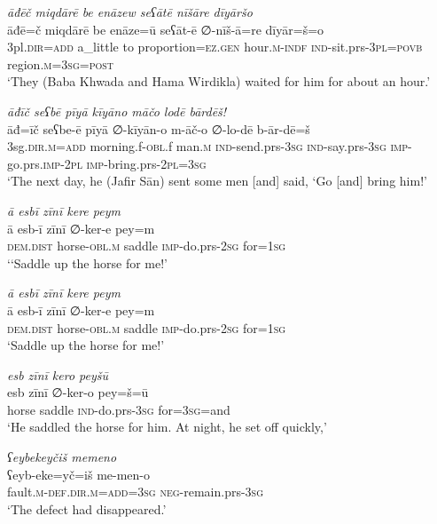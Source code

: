 \ea \label{BP.189}
\textit{āđēč miqdārē be enāzew seʕātē nīšāre dīyāršo} \\ 
\gll āđē=č miqdārē be enāze=ū seʕāt-ē ∅-nīš-ā=re dīyār=š=o \\ 
 3pl\textsc{.dir}\textsc{=add} a\_little to proportion\textsc{=ez.gen} hour\textsc{.m}\textsc{-indf} \textsc{ind-}sit.prs\textsc{-3pl}\textsc{=\textsc{povb}} region\textsc{.m}\textsc{=3sg}\textsc{=\textsc{post}} \\ 
\glt `They (Baba Khwada and Hama Wirdikla) waited for him for about an hour.'
\z 
 
\ea \label{ŠJ.20}
\textit{āđīč seʕbē pīyā kīyāno māčo lodē bārdēš!} \\ 
\gll āđ=īč seʕbe-ē pīyā ∅-kīyān-o m-āč-o ∅-lo-dē b-ār-dē=š \\ 
 3sg\textsc{.dir}\textsc{.m}\textsc{=add} morning.f\textsc{-obl}.f man\textsc{.m} \textsc{ind-}send.prs\textsc{-3sg} \textsc{ind-}say.prs\textsc{-3sg} \textsc{imp-}go.prs.\textsc{imp-}\textsc{2pl} \textsc{imp-}bring.prs-\textsc{2pl}\textsc{=3sg} \\ 
\glt `The next day, he (Jafir Sān) sent some men [and] said, ‘Go [and] bring him!'
\z 
 
\ea \label{ŠJ.52}
\textit{ā esbī zīnī kere peym} \\ 
\gll ā esb-ī zīnī ∅-ker-e pey=m \\ 
 \textsc{dem.dist} horse\textsc{-obl}\textsc{.m} saddle \textsc{imp-}do.prs-\textsc{2sg} for\textsc{=\textsc{1sg}} \\ 
\glt `‘Saddle up the horse for me!'
\z 
 
\ea \label{ŠJ.53}
\textit{ā esbī zīnī kere peym} \\ 
\gll ā esb-ī zīnī ∅-ker-e pey=m \\ 
 \textsc{dem.dist} horse\textsc{-obl}\textsc{.m} saddle \textsc{imp-}do.prs-\textsc{2sg} for\textsc{=\textsc{1sg}} \\ 
\glt `Saddle up the horse for me!'
\z 
 
\ea \label{ŠJ.54}
\textit{esb zīnī kero peyšū} \\ 
\gll esb zīnī ∅-ker-o pey=š=ū \\ 
 horse saddle \textsc{ind-}do.prs\textsc{-3sg} for\textsc{=3sg}=and \\ 
\glt `He saddled the horse for him. At night, he set off quickly,'
\z 
 
\ea \label{ŠJ.82}
\textit{ʕeybekeyčiš memeno} \\ 
\gll ʕeyb-eke=yč=iš me-men-o \\ 
 fault\textsc{.m}\textsc{-def}\textsc{.dir}\textsc{.m}\textsc{=add}\textsc{=3sg} \textsc{neg-}remain.prs\textsc{-3sg} \\ 
\glt `The defect had disappeared.'
\z 
 
